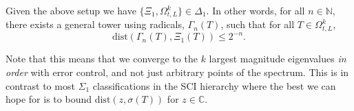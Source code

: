 \documentclass[a4paper,10pt]{article}
\begin{document}
\begin{theorem}
\label{class1}
Given the above setup we have $\{\Xi_1,\Omega^k_{t,L}\}\in \Delta_1.$ In other words, for all $n\in\mathbb{N}$, there exists a general tower using radicals, $\Gamma_n(T)$, such that for all $T\in\Omega^k_{t,L}$,
$$
\mathrm{dist}(\Gamma_n(T),\Xi_1(T))\leq 2^{-n}.
$$
\end{theorem}

\begin{remark}
Note that this means that we converge to the $k$ largest magnitude eigenvalues \textit{in order} with error control, and not just arbitrary points of the spectrum. This is in contrast to most $\Sigma_1$ classifications in the SCI hierarchy where the best we can hope for is to bound $\mathrm{dist}(z,\sigma(T))$ for $z\in\mathbb{C}$.
\end{remark}
\end{document}
